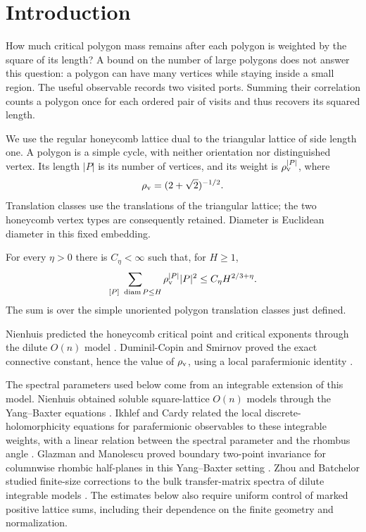 \section{Introduction}
\label{sec:introduction}

How much critical polygon mass remains after each polygon is weighted by
the square of its length? A bound on the number of large polygons does
not answer this question: a polygon can have many vertices while staying
inside a small region. The useful observable records two visited ports.
Summing their correlation counts a polygon once for each ordered pair
of visits and thus recovers its squared length.

We use the regular honeycomb lattice dual to the triangular lattice of
side length one. A polygon is a simple cycle, with neither orientation
nor distinguished vertex. Its length $|P|$ is its number of vertices,
and its weight is $\rho_{\rm v}^{|P|}$, where
\[
 \rho_{\rm v}=(2+\sqrt2)^{-1/2}.
\]
Translation classes use the translations of the triangular lattice;
the two honeycomb vertex types are consequently retained. Diameter is
Euclidean diameter in this fixed embedding.

\begin{theorem}\label{thm:polygon-moment}
For every $\eta>0$ there is $C_\eta<\infty$ such that, for $H\ge1$,
\[
 \sum_{\substack{[P]\ \operatorname{diam}P\le H}}
       \rho_{\rm v}^{|P|}|P|^2\le C_\eta H^{2/3+\eta}.
\]
The sum is over the simple unoriented polygon translation classes just
defined.
\end{theorem}

Nienhuis predicted the honeycomb critical point and critical exponents
through the dilute $O(n)$ model
\cite{Nienhuis1982}. Duminil-Copin and Smirnov proved the exact
connective constant, hence the value of $\rho_{\rm v}$, using a local
parafermionic identity \cite{DCS2012}.

The spectral parameters used below come from an integrable extension
of this model. Nienhuis obtained soluble square-lattice $O(n)$ models
through the Yang--Baxter equations \cite{Nienhuis1990CriticalMulticritical}.
Ikhlef and Cardy related the local discrete-holomorphicity equations
for parafermionic observables to these integrable weights, with a linear
relation between the spectral parameter and the rhombus angle
\cite[Section~3]{IkhlefCardy2009}. Glazman and Manolescu proved
boundary two-point invariance for columnwise rhombic half-planes
in this Yang--Baxter setting \cite{GM2019}. Zhou and Batchelor studied
finite-size corrections to the bulk transfer-matrix spectra of dilute
integrable models \cite{ZhouBatchelor1997}.
The estimates below also require uniform control of marked positive
lattice sums, including their dependence on the finite geometry and
normalization.

